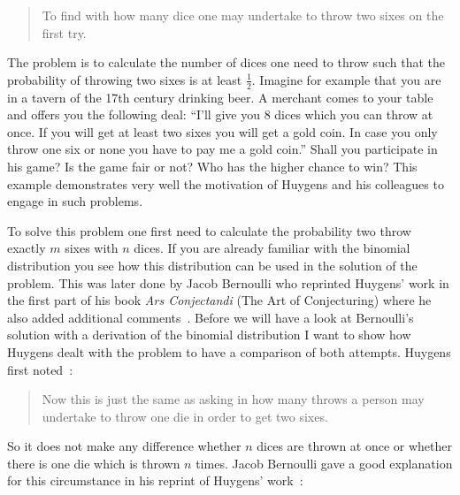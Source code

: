 \begin{quotation}
  To find with how many dice one may undertake to throw two sixes on the first try.
\end{quotation}


The problem is to calculate the number of dices one need to throw such that the probability of throwing two sixes is at least $\tfrac 12$. Imagine for example that you are in a tavern of the 17th century drinking beer. A merchant comes to your table and offers you the following deal: ``I'll give you $8$ dices which you can throw at once. If you will get at least two sixes you will get a gold coin. In case you only throw one six or none you have to pay me a gold coin.'' Shall you participate in his game? Is the game fair or not? Who has the higher chance to win? This example demonstrates very well the motivation of Huygens and his colleagues to engage in such problems. 

To solve this problem one first need to calculate the probability two throw exactly $m$ sixes with $n$ dices. If you are already familiar with the binomial distribution you see how this distribution can be used in the solution of the problem. This was later done by Jacob Bernoulli who reprinted Huygens' work in the first part of his book \emph{Ars Conjectandi} (The Art of Conjecturing) where he also added additional comments~\cite[p. 63]{bernoulli}. Before we will have a look at Bernoulli's solution with a derivation of the binomial distribution I want to show how Huygens dealt with the problem to have a comparison of both attempts. Huygens first noted~\cite[p. 163]{bernoulli}:

\begin{quotation}
  Now this is just the same as asking in how many throws a person may undertake to throw one die in order to get two sixes.
\end{quotation}

So it does not make any difference whether $n$ dices are thrown at once or whether there is one die which is thrown $n$ times. Jacob Bernoulli gave a good explanation for this circumstance in his reprint of Huygens' work~\cite[p. 163]{bernoulli}:


